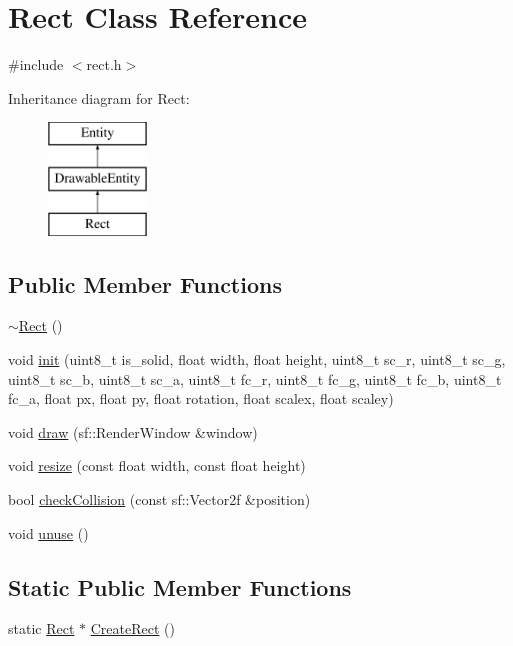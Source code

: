 \hypertarget{class_rect}{}\section{Rect Class Reference}
\label{class_rect}


{\ttfamily \#include $<$rect.\+h$>$}

Inheritance diagram for Rect\+:\begin{figure}[H]
\begin{center}
\leavevmode
\includegraphics[height=3.000000cm]{class_rect}
\end{center}
\end{figure}
\subsection*{Public Member Functions}
\begin{DoxyCompactItemize}
\item 
\hyperlink{class_rect_af5c075b863024c3e39add95e07d10f39}{$\sim$\+Rect} ()
\item 
void \hyperlink{class_rect_aa780623e4639a2679ed300424142d50d}{init} (uint8\+\_\+t is\+\_\+solid, float width, float height, uint8\+\_\+t sc\+\_\+r, uint8\+\_\+t sc\+\_\+g, uint8\+\_\+t sc\+\_\+b, uint8\+\_\+t sc\+\_\+a, uint8\+\_\+t fc\+\_\+r, uint8\+\_\+t fc\+\_\+g, uint8\+\_\+t fc\+\_\+b, uint8\+\_\+t fc\+\_\+a, float px, float py, float rotation, float scalex, float scaley)
\item 
void \hyperlink{class_rect_aa131d780f6ebb75e9057c01221486adc}{draw} (sf\+::\+Render\+Window \&window)
\item 
void \hyperlink{class_rect_ab7593e78f2fbc2354d8ef832ac3625a7}{resize} (const float width, const float height)
\item 
bool \hyperlink{class_rect_afb4fd23ac0ebf55ef7d9c1bcdcc7ff30}{check\+Collision} (const sf\+::\+Vector2f \&position)
\item 
void \hyperlink{class_rect_a31c7cbadb97080dfb559f3d04acc0bc9}{unuse} ()
\end{DoxyCompactItemize}
\subsection*{Static Public Member Functions}
\begin{DoxyCompactItemize}
\item 
static \hyperlink{class_rect}{Rect} $\ast$ \hyperlink{class_rect_ac9283327c926d453d0cd5a49ded8d150}{Create\+Rect} ()
\end{DoxyCompactItemize}
